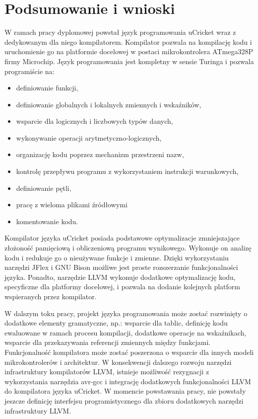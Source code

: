 \chapter{Podsumowanie i wnioski}

W ramach pracy dyplomowej powstał język programowania uCricket wraz z dedykowanym dla niego  kompilatorem. Kompilator pozwala na kompilację kodu i uruchomienie go na platformie docelowej w postaci mikrokontrolera ATmega328P firmy Microchip.
Język programowania jest kompletny w sensie Turinga i pozwala programiście na:
\begin{itemize}
\item definiowanie funkcji,
\item definiowanie globalnych i lokalnych zmiennych i wskaźników,
\item wsparcie dla logicznych i liczbowych typów danych,
\item wykonywanie operacji arytmetyczno-logicznych,
\item organizację kodu poprzez mechanizm przestrzeni nazw,
\item kontrolę przepływu programu z wykorzystaniem instrukcji warunkowych,
\item definiowanie pętli,
\item pracę z wieloma plikami źródłowymi
\item komentowanie kodu.
\end{itemize}

Kompilator języka uCricket posiada podstawowe  optymalizacje zmniejszające złożoność pamięciową i obliczeniową programu wynikowego. Wykonuje on analizę kodu i redukuje go o nieużywane funkcje i zmienne. 
Dzięki wykorzystaniu narzędzi JFlex i GNU Bison możliwe jest proste rozszerzanie funkcjonalności języka. Ponadto, narzędzie LLVM wykonuje dodatkowe optymalizację kodu, specyficzne dla platformy docelowej, i pozwala na dodanie kolejnych platform wspieranych przez kompilator.

W dalszym toku pracy, projekt języka programowania może zostać rozwinięty o dodatkowe elementy gramatyczne, np.: wsparcie dla tablic, definicję kodu ewaluowane w ramach procesu kompilacji, dodatkowe operacje na wskaźnikach, wsparcie dla przekazywania referencji zmiennych między funkcjami.
Funkcjonalność kompilatora może zostać poszerzona o wsparcie dla innych modeli mikrokontrolerów i architektur. W konsekwencji dalszego rozwoju narzędzi infrastruktury kompilatorów LLVM, istnieje możliwość rezygnacji z wykorzystania narzędzia avr-gcc i integrację dodatkowych funkcjonalności LLVM do kompilatora języka uCricket. W momencie powstawania pracy, nie powstały jeszcze definicję interfejsu programistycznego dla zbioru dodatkowych narzędzi infrastruktury LLVM.

